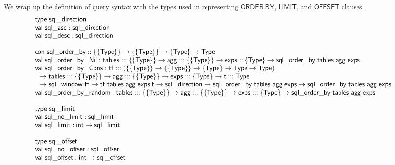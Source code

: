 \documentclass{article}
\newcommand{\mt}[1]{\mathsf{#1}}
\begin{document}
We wrap up the definition of query syntax with the types used in representing $\mt{ORDER} \; \mt{BY}$, $\mt{LIMIT}$, and $\mt{OFFSET}$ clauses.
$$\begin{array}{l}
  \mt{type} \; \mt{sql\_direction} \\
  \mt{val} \; \mt{sql\_asc} : \mt{sql\_direction} \\
  \mt{val} \; \mt{sql\_desc} : \mt{sql\_direction} \\
  \\
  \mt{con} \; \mt{sql\_order\_by} :: \{\{\mt{Type}\}\} \to \{\{\mt{Type}\}\} \to \{\mt{Type}\} \to \mt{Type} \\
  \mt{val} \; \mt{sql\_order\_by\_Nil} : \mt{tables} ::: \{\{\mt{Type}\}\} \to \mt{agg} ::: \{\{\mt{Type}\}\} \to \mt{exps} :: \{\mt{Type}\} \to \mt{sql\_order\_by} \; \mt{tables} \; \mt{agg} \; \mt{exps} \\
  \mt{val} \; \mt{sql\_order\_by\_Cons} : \mt{tf} ::: (\{\{\mt{Type}\}\} \to \{\{\mt{Type}\}\} \to \{\mt{Type}\} \to \mt{Type} \to \mt{Type}) \\
  \hspace{.1in} \to \mt{tables} ::: \{\{\mt{Type}\}\} \to \mt{agg} ::: \{\{\mt{Type}\}\} \to \mt{exps} ::: \{\mt{Type}\} \to \mt{t} ::: \mt{Type} \\
  \hspace{.1in} \to \mt{sql\_window} \; \mt{tf} \to \mt{tf} \; \mt{tables} \; \mt{agg} \; \mt{exps} \; \mt{t} \to \mt{sql\_direction} \to \mt{sql\_order\_by} \; \mt{tables} \; \mt{agg} \; \mt{exps} \to \mt{sql\_order\_by} \; \mt{tables} \; \mt{agg} \; \mt{exps} \\
  \mt{val} \; \mt{sql\_order\_by\_random} : \mt{tables} ::: \{\{\mt{Type}\}\} \to \mt{agg} ::: \{\{\mt{Type}\}\} \to \mt{exps} ::: \{\mt{Type}\} \to \mt{sql\_order\_by} \; \mt{tables} \; \mt{agg} \; \mt{exps} \\
  \\
  \mt{type} \; \mt{sql\_limit} \\
  \mt{val} \; \mt{sql\_no\_limit} : \mt{sql\_limit} \\
  \mt{val} \; \mt{sql\_limit} : \mt{int} \to \mt{sql\_limit} \\
  \\
  \mt{type} \; \mt{sql\_offset} \\
  \mt{val} \; \mt{sql\_no\_offset} : \mt{sql\_offset} \\
  \mt{val} \; \mt{sql\_offset} : \mt{int} \to \mt{sql\_offset}
\end{array}$$
\end{document}
